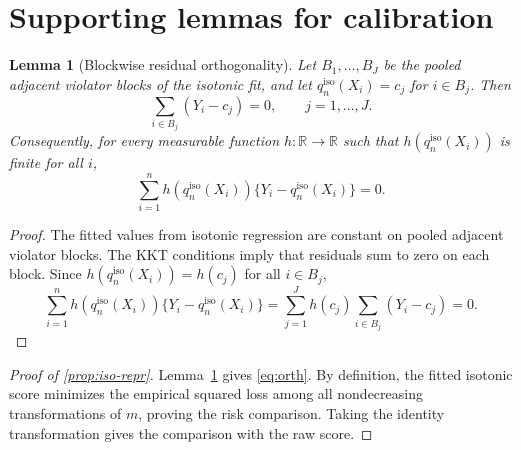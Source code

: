 \documentclass{article}
\theoremstyle{plain}
\newtheorem{lemma}{Lemma}
\theoremstyle{definition}
\newcommand{\R}{\mathbb{R}}
\newcommand{\1}{\mathbf{1}}
\newcommand{\mhat}{m}
\begin{document}
\section{Supporting lemmas for calibration}
\label{app:iso-lemmas}

\begin{lemma}[Blockwise residual orthogonality]
\label{lem:block}
Let \(B_1,\dots,B_J\) be the pooled adjacent violator blocks of the isotonic fit, and let \(q_n^{\mathrm{iso}}(X_i)=c_j\) for \(i \in B_j\). Then
\[
\sum_{i \in B_j}(Y_i-c_j)=0,
\qquad j=1,\dots,J.
\]
Consequently, for every measurable function \(h:\R \to \R\) such that \(h(q_n^{\mathrm{iso}}(X_i))\) is finite for all \(i\),
\[
\sum_{i=1}^n h(q_n^{\mathrm{iso}}(X_i))\{Y_i-q_n^{\mathrm{iso}}(X_i)\}=0.
\]
\end{lemma}

\begin{proof}
The fitted values from isotonic regression are constant on pooled adjacent violator blocks. The KKT conditions imply that residuals sum to zero on each block. Since \(h(q_n^{\mathrm{iso}}(X_i))=h(c_j)\) for all \(i \in B_j\),
\[
\sum_{i=1}^n h(q_n^{\mathrm{iso}}(X_i))\{Y_i-q_n^{\mathrm{iso}}(X_i)\}
=
\sum_{j=1}^J h(c_j)\sum_{i \in B_j}(Y_i-c_j)
=
0.
\]
\end{proof}

\begin{proof}[Proof of \cref{prop:iso-repr}]
Lemma~\ref{lem:block} gives \eqref{eq:orth}.
By definition, the fitted isotonic score minimizes the empirical squared loss
among all nondecreasing transformations of \(\mhat\), proving the risk
comparison. Taking the identity transformation gives the comparison with the
raw score.
\end{proof}
\end{document}
